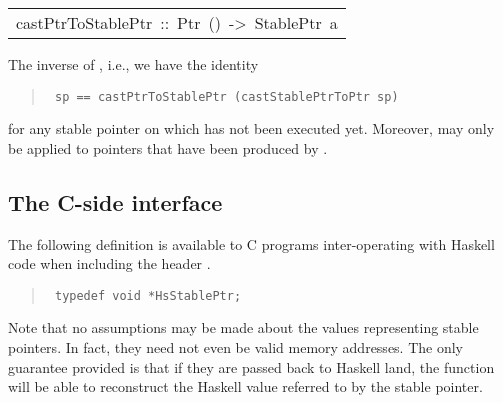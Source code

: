 \begin{haddockdesc}
\item[\begin{tabular}{@{}l}
castPtrToStablePtr\ ::\ Ptr\ ()\ ->\ StablePtr\ a
\end{tabular}]\haddockbegindoc
The inverse of , i.e., we have the identity
\par
\begin{quote}
{\haddockverb\begin{verbatim}
 sp == castPtrToStablePtr (castStablePtrToPtr sp)
\end{verbatim}}
\end{quote}
for any stable pointer  on which  has
 not been executed yet.  Moreover,  may
 only be applied to pointers that have been produced by
 .
\par

\end{haddockdesc}
\subsection{The C-side interface
}
The following definition is available to C programs inter-operating with
 Haskell code when including the header .
\par
\begin{quote}
{\haddockverb\begin{verbatim}
 typedef void *HsStablePtr;  
\end{verbatim}}
\end{quote}
Note that no assumptions may be made about the values representing stable
 pointers.  In fact, they need not even be valid memory addresses.  The only
 guarantee provided is that if they are passed back to Haskell land, the
 function  will be able to reconstruct the
 Haskell value referred to by the stable pointer.
\par
